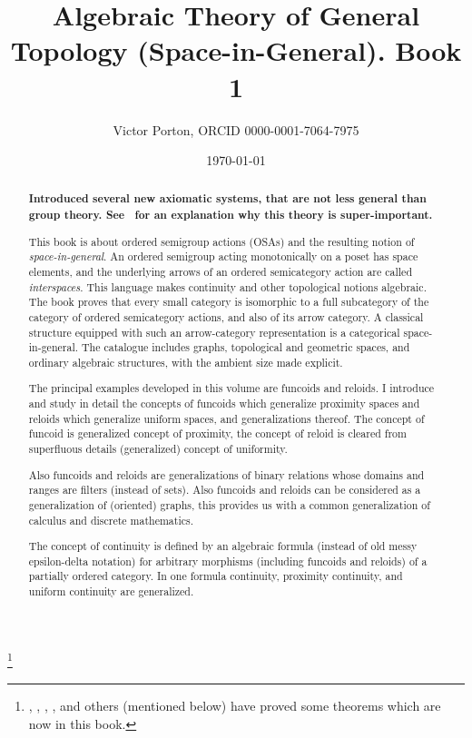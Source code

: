 \documentclass[a4paper,oneside,english,reqno]{amsbook}
\numberwithin{section}{chapter}
\begin{document}
\title{Algebraic Theory of General Topology (Space-in-General). Book 1}


\author{Victor Porton, ORCID 0000-0001-7064-7975}






\date{\today}


\thanks{, , , , and others (mentioned below) have proved some theorems which are now in this book.}
\begin{abstract}
\textbf{Introduced several new axiomatic systems, that are not less general than group theory.
See~\cite{important} for an explanation why this theory is super-important.}

This book is about ordered semigroup actions (OSAs) and the resulting
notion of \emph{space-in-general}. An ordered semigroup acting
monotonically on a poset has space elements, and the underlying arrows
of an ordered semicategory action are called \emph{interspaces}.
This language makes continuity and other topological notions algebraic.
The book proves that every small category is isomorphic to a full
subcategory of the category of ordered semicategory actions, and also
of its arrow category. A classical structure equipped with such an
arrow-category representation is a categorical space-in-general.
The catalogue includes graphs, topological and geometric spaces, and
ordinary algebraic structures, with the ambient size made explicit.

The principal examples developed in this volume are funcoids and reloids.
I introduce and study in detail the concepts of funcoids
which generalize proximity spaces and reloids which generalize uniform
spaces, and generalizations thereof. The concept of funcoid is generalized
concept of proximity, the concept of reloid is cleared from superfluous
details (generalized) concept of uniformity. 

Also funcoids and reloids are generalizations of binary relations
whose domains and ranges are filters (instead of sets). Also funcoids
and reloids can be considered as a generalization of (oriented) graphs,
this provides us with a common generalization of calculus and discrete
mathematics.

The concept of continuity is defined by an algebraic formula (instead
of old messy epsilon-delta notation) for arbitrary morphisms (including
funcoids and reloids) of a partially ordered category. In one formula
continuity, proximity continuity, and uniform continuity are generalized.


\end{abstract}
\end{document}
